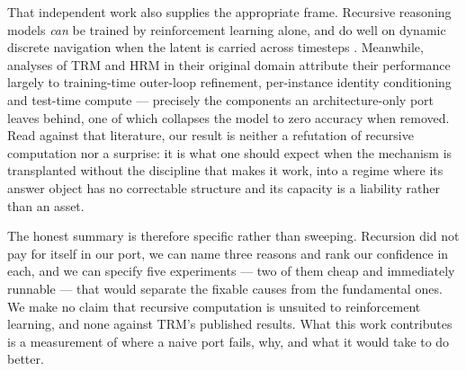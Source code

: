 \documentclass[11pt]{article}
\begin{document}
That independent work also supplies the appropriate frame. Recursive reasoning models \emph{can} be trained by reinforcement learning alone, and do well on dynamic discrete navigation when the latent is carried across timesteps \citep{dang2025hrmagent}. Meanwhile, analyses of TRM and HRM in their original domain attribute their performance largely to training-time outer-loop refinement, per-instance identity conditioning and test-time compute \citep{arcprize2025hrm, royeazar2026trm} --- precisely the components an architecture-only port leaves behind, one of which collapses the model to zero accuracy when removed. Read against that literature, our result is neither a refutation of recursive computation nor a surprise: it is what one should expect when the mechanism is transplanted without the discipline that makes it work, into a regime where its answer object has no correctable structure and its capacity is a liability rather than an asset.

The honest summary is therefore specific rather than sweeping. Recursion did not pay for itself in our port, we can name three reasons and rank our confidence in each, and we can specify five experiments --- two of them cheap and immediately runnable --- that would separate the fixable causes from the fundamental ones. We make no claim that recursive computation is unsuited to reinforcement learning, and none against TRM's published results. What this work contributes is a measurement of where a naive port fails, why, and what it would take to do better.
\end{document}
